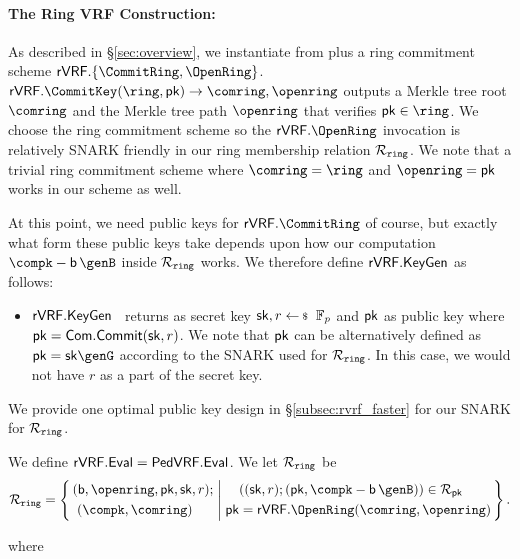 \paragraph{The Ring VRF Construction:}
As described in \S\ref{sec:overview},
we instantiate \rVRF from \PedVRF plus a ring commitment scheme
 $\rVRF.\{ \CommitRing, \OpenRing \}$. $ \rVRF.\CommitKey(\ring,\pk) \rightarrow \comring,\openring$  outputs a Merkle tree root $\comring  $ and the Merkle tree path $ \openring $ that verifies $ \pk \in \ring $.
We choose the ring commitment scheme so the $\rVRF.\OpenRing$ invocation
is relatively SNARK friendly in our ring membership relation $ \mathcal{R}_{\mathtt{ring}} $. We note that a trivial ring commitment scheme where $ \comring = \ring $ and $ \openring = \pk $ works in our scheme as well.

At this point, we need public keys for $\rVRF.\CommitRing$ of course,
but exactly what form these public keys take depends upon how our computation
 $\compk - \openpk \, \genB$ inside $\mathcal{R}_{\mathtt{ring}}$ works.
We therefore define $ {\mathsf{rVRF}}.{\mathsf{KeyGen}} $ as follows:

\begin{itemize}
	\item ${\mathsf{rVRF}}.{\mathsf{KeyGen}}$ \, returns as secret key $\sk,r \leftsample \F_p$ and $ \mathsf{pk} $ as public key where $ \mathsf{pk} = \mathsf{Com}.\mathsf{Commit}(\mathsf{sk},r)  $. We note that $ \mathsf{pk}  $ can be alternatively defined as $ \pk = \sk \genG $ according to the SNARK used for $ \mathcal{R}_{\mathtt{ring}} $. In this case, we would not have $ r $ as a part of the secret key.
\end{itemize}

 
We provide one optimal public key design in \S\ref{subsec:rvrf_faster} for our SNARK  for $ \mathcal{R}_{\mathtt{ring}} $. 

We define ${\mathsf{rVRF}}.{\mathsf{Eval}} = {\mathsf{PedVRF}}.{\mathsf{Eval}}$.
We let  $ \mathcal{R}_{\mathtt{ring}} $ be
$$ \Rring = \Setst{ 
	\begin{aligned}
		& (\openpk, \openring, \pk, \sk, r); \\ 
		& \,\, (\compk,\comring) 
	\end{aligned}
}{
	\begin{aligned}
		 &((\sk, r);(\pk, \compk - \openpk \, \genB)) \in \rel_{\pk} \\
		\pk &= \rVRF.\OpenRing(\comring,\openring)
	\end{aligned}
} \mathperiod $$

where 

